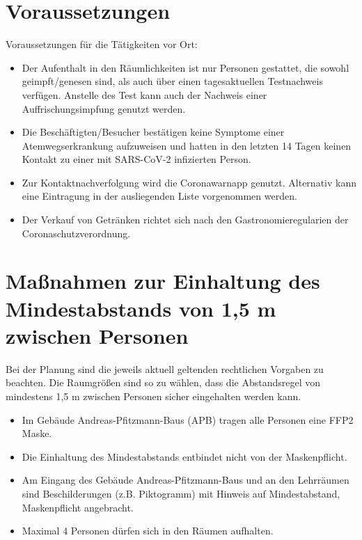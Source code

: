 \documentclass[12pt]{article}
\begin{document}
    \section{Voraussetzungen}
        Voraussetzungen für die Tätigkeiten vor Ort:
        \begin{itemize}
            \item Der Aufenthalt in den Räumlichkeiten ist nur Personen gestattet, die sowohl geimpft/genesen sind, als auch über einen tagesaktuellen Testnachweis verfügen. Anstelle des Test kann auch der Nachweis einer Auffrischungsimpfung genutzt werden.
            \item Die Beschäftigten/Besucher bestätigen keine Symptome einer Atem\-wegs\-erkrankung aufzuweisen und hatten in den letzten 14 Tagen keinen Kontakt zu einer mit SARS-CoV-2 infizierten Person.
            \item Zur Kontaktnachverfolgung wird die Coronawarnapp genutzt. Alternativ kann eine Eintragung in der ausliegenden Liste vorgenommen werden.
            \item Der Verkauf von Getränken richtet sich nach den Gastronomieregularien der Coronaschutzverordnung.
        \end{itemize}

    \section{Maßnahmen zur Einhaltung des Mindestabstands von 1,5 m zwischen Personen}
        Bei der Planung sind die jeweils aktuell geltenden rechtlichen Vorgaben zu beachten.
        Die Raumgrößen sind so zu wählen, dass die Abstandsregel von mindestens 1,5 m zwischen Personen sicher eingehalten werden kann.
        \begin{itemize}
            \item Im Gebäude Andreas-Pfitzmann-Baus (APB) tragen alle Personen eine FFP2 Maske.
            \item Die Einhaltung des Mindestabstands entbindet nicht von der Masken\-pflicht.
            \item Am Eingang des Gebäude Andreas-Pfitzmann-Baus und an den Lehr\-räumen sind Beschilderungen (z.B. Piktogramm) mit Hinweis auf Mindestabstand, Maskenpflicht angebracht.
            \item Maximal 4 Personen dürfen sich in den Räumen aufhalten.
        \end{itemize}

        \begin{center}
            
        \end{center}
\end{document}

